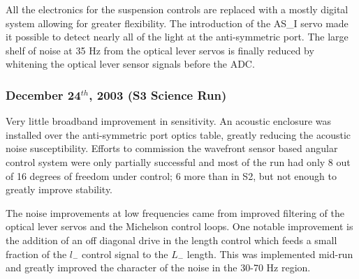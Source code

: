 All the electronics for the suspension controls are replaced with a mostly digital 
system allowing for greater flexibility. The introduction of the AS\_I servo
made it possible to detect nearly all of the light at the anti-symmetric port.
The large shelf of noise at 35 Hz from the optical lever servos is finally
reduced by whitening the optical lever sensor signals before the ADC.


\subsubsection{December 24$^{th}$, 2003  (S3 Science Run)}

Very little broadband improvement in sensitivity. An acoustic enclosure
was installed over the anti-symmetric port optics table, greatly reducing the
acoustic noise susceptibility. Efforts to commission the wavefront sensor
based angular control system were only partially successful and most of the run
had only 8 out of 16 degrees of freedom under control; 6 more than in S2, but not
enough to greatly improve stability.

The noise improvements at low
frequencies came from improved filtering of the optical lever servos
and the Michelson control loops. One notable improvement is the addition
of an off diagonal drive in the length control which feeds a small
fraction of the $l_-$ control signal to the $L_-$ length. This was
implemented mid-run and greatly improved the character of the noise
in the 30-70 Hz region.


